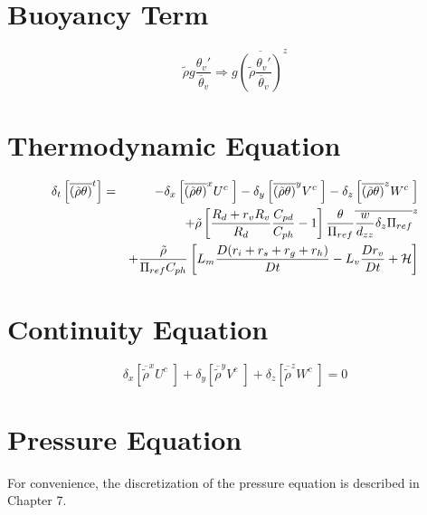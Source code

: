 \section{Buoyancy Term}
\begin{equation}
\tilde{\rho} g \dfrac{\theta_v ' }{\overline{\theta}_v}
\Longrightarrow g \overline{ \left(
\tilde{\rho}\dfrac{\theta_v ' }{\overline{\theta}_v}\right) }^{z}
\end{equation}

\section{Thermodynamic Equation}

\begin{eqnarray}
\delta _{t } \left[ \overline{ \left( \tilde{\rho} \theta
\right)}^{t} \right]  & =  & - \delta_{x} \left[\overline{\left(
\tilde{\rho} \theta\right)}^{x} U^{c} \;
\right] - \delta_{y} \left[\overline{\left(
\tilde{\rho}\theta\right)}^{y}  V^{c} \;
\right] - \delta_{z} \left[\overline{ \left(
\tilde{\rho}\theta\right)}^{z} W^{c} \;
\right] \nonumber \\ & &
+\tilde{\rho} \left[ {R_d+r_vR_v\over R_d}{C_{pd} \over C_{ph}}-1 \right]
{\theta \over \Pi_{ref}} \overline{ {w \over d_{zz} } \delta_z \Pi_{ref} }^z
\nonumber \\ & &
+ {\tilde{\rho}\over \Pi_{ref} C_{ph}} \left[
 L_m {D(r_i+r_s+r_g+r_h)\over Dt} - L_v {Dr_v\over Dt} + {\cal H}  \right]
\end{eqnarray}


\section{Continuity Equation}

\begin{equation}
\delta_{x} \left[ \overline{\tilde{\rho}}^{x} U^{c} \; \right] +
\delta_{y} \left[ \overline{\tilde{\rho}}^{y} V^{c} \; \right] +
\delta_{z} \left[ \overline{\tilde{\rho}}^{z} W^{c} \; \right] =0
\end{equation}

\section{Pressure Equation}

For convenience, the discretization of the pressure equation is described
in Chapter 7.




